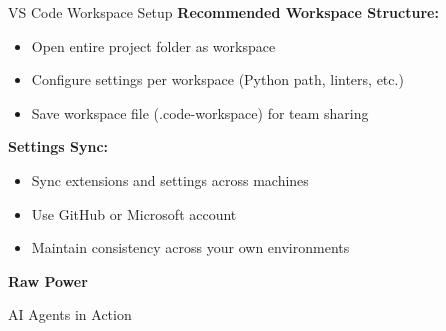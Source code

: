 \documentclass[11pt,aspectratio=169]{beamer}
\begin{document}
\begin{frame}{VS Code Workspace Setup}
\textbf{Recommended Workspace Structure:}
\begin{itemize}
    \item Open entire project folder as workspace
    \item Configure settings per workspace (Python path, linters, etc.)
    \item Save workspace file (.code-workspace) for team sharing
\end{itemize}

\vspace{0.3cm}

\textbf{Settings Sync:}
\begin{itemize}
    \item Sync extensions and settings across machines
    \item Use GitHub or Microsoft account
    \item Maintain consistency across your own environments
\end{itemize}


\end{frame}


\begin{frame}[plain]
    \centering
    \vspace{1cm}
    \textbf{\Huge Raw Power}

    \vspace{0.5cm}
    {\Large AI Agents in Action}

    \vspace{1.5cm}
\end{frame}
\end{document}
